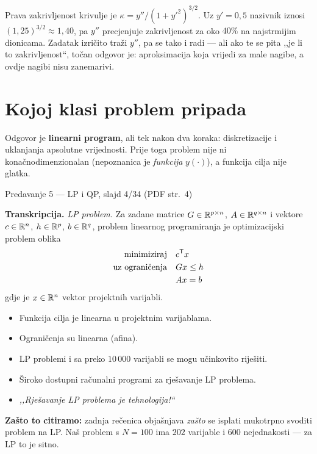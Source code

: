 \begin{zamka}
Prava zakrivljenost krivulje je $\kappa = y''/(1+y'^2)^{3/2}$. Uz $y' = 0{,}5$
nazivnik iznosi $(1{,}25)^{3/2} \approx 1{,}40$, pa $y''$ precjenjuje
zakrivljenost za oko $40\%$ na najstrmijim dionicama. Zadatak izričito traži
$y''$, pa se tako i radi --- ali ako te se pita ,,je li to zakrivljenost``,
točan odgovor je: aproksimacija koja vrijedi za male nagibe, a ovdje nagibi nisu
zanemarivi.
\end{zamka}

\section{Kojoj klasi problem pripada}
\label{sec:z3-klasa}

Odgovor je \textbf{linearni program}, ali tek nakon dva koraka: diskretizacije i
uklanjanja apsolutne vrijednosti. Prije toga problem nije ni konačnodimenzionalan
(nepoznanica je \emph{funkcija} $y(\cdot)$), a funkcija cilja nije glatka.

\begin{izvor}{Predavanje 5 --- LP i QP, slajd 4/34 (PDF str.~4)}

\textbf{Transkripcija.} \emph{LP problem.} Za zadane matrice $G \in \mathbb{R}^{p\times n}$,
$A \in \mathbb{R}^{q\times n}$ i vektore $c \in \mathbb{R}^n$, $h \in \mathbb{R}^p$, $b \in \mathbb{R}^q$,
problem linearnog programiranja je optimizacijski problem oblika
\[
\begin{aligned}
\text{minimiziraj} \quad & c^{\mathsf{T}} x \\
\text{uz ograničenja} \quad & Gx \leq h \\
& Ax = b
\end{aligned}
\]
gdje je $x \in \mathbb{R}^n$ vektor projektnih varijabli.
\begin{itemize}[nosep,leftmargin=*]
  \item Funkcija cilja je linearna u projektnim varijablama.
  \item Ograničenja su linearna (afina).
  \item LP problemi i sa preko $10\,000$ varijabli se mogu učinkovito riješiti.
  \item Široko dostupni računalni programi za rješavanje LP problema.
  \item \emph{,,Rješavanje LP problema je tehnologija!``}
\end{itemize}

\textbf{Zašto to citiramo:} zadnja rečenica objašnjava \emph{zašto} se isplati
mukotrpno svoditi problem na LP. Naš problem s $N = 100$ ima $202$ varijable i
$600$ nejednakosti --- za LP to je sitno.
\end{izvor}

